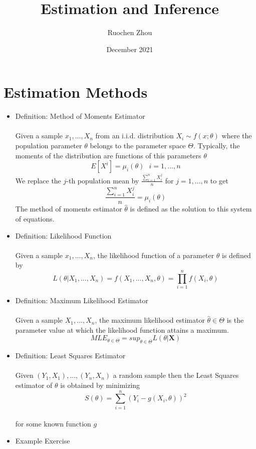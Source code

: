 \documentclass{article}
\title{Estimation and Inference}
\author{Ruochen Zhou}
\date{December 2021}
\begin{document}
\maketitle

\section{Estimation Methods}
\begin{itemize}
    \item Definition: Method of Moments Estimator\\\\
    Given a sample $x_1,...,X_n$ from an i.i.d. distribution $X_i\sim f(x;\theta)$ where the population parameter $\theta$ belongs to the parameter space $\Theta$.  Typically, the moments of the distribution are functions of this parameters $\theta$\\
    $$E[X^i]=\mu_i(\theta)\text{ }i=1,...,n$$
    We replace the $j$-th population mean by $\frac{\sum_{i=1}^nX_i^j}{n}$ for $j=1,...,n$ to get \\
    $$\frac{\sum_{i=1}^nX_i^j}{n}=\mu_i(\theta)$$
    The method of moments estimator $\hat{\theta}$ is defined as the solution to this system of equations.
    \item Definition: Likelihood Function\\\\
    Given a sample $x_1,...,X_n$, the likelihood function of a parameter $\theta$ is defined by\\
    $$L(\theta|X_1,...,X_n)=f(X_1,...,X_n,\theta)=\prod_{i=1}^nf(X_i,\theta)$$
    \item Definition: Maximum Likelihood Estimator\\\\
    Given a sample $X_1,...,X_n$, the maximum likelihood estimator $\hat{\theta}\in\Theta$ is the parameter value at which the likelihood function attains a maximum.\\
    $$MLE_{\theta\in\Theta}=sup_{\theta\in\Theta}L(\theta|\textbf{X})$$
    \item Definition: Least Squares Estimator\\\\
    Given $(Y_1,X_1),...,(Y_n,X_n)$ a random sample then the Least Squares estimator of $\theta$ is obtained by minimizing\\
    $$S(\theta)=\sum_{i=1}^n(Y_i-g(X_i,\theta))^2$$\\
    for some known function $g$
    \item Example Exercise\\\\

\end{itemize}
\end{document}
